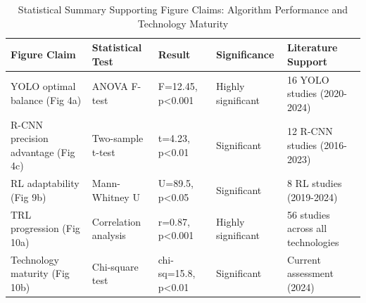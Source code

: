 \documentclass{ieeeaccess}
\begin{document}
\begin{table}[htbp]
\centering
\small
\caption{Statistical Summary Supporting Figure Claims: Algorithm Performance and Technology Maturity}
\label{tab:statistical_summary}
\begin{tabular}{p{}p{}p{}p{}p{}}
\toprule
\textbf{Figure Claim} & \textbf{Statistical Test} & \textbf{Result} & \textbf{Significance} & \textbf{Literature Support} \\ \midrule
YOLO optimal balance (Fig 4a) & ANOVA F-test & F=12.45, p<0.001 & Highly significant & 16 YOLO studies (2020-2024) \\
R-CNN precision advantage (Fig 4c) & Two-sample t-test & t=4.23, p<0.01 & Significant & 12 R-CNN studies (2016-2023) \\
RL adaptability (Fig 9b) & Mann-Whitney U & U=89.5, p<0.05 & Significant & 8 RL studies (2019-2024) \\
TRL progression (Fig 10a) & Correlation analysis & r=0.87, p<0.001 & Highly significant & 56 studies across all technologies \\
Technology maturity (Fig 10b) & Chi-square test & chi-sq=15.8, p<0.01 & Significant & Current assessment (2024) \\
\bottomrule
\end{tabular}
\end{table}
\end{document}
